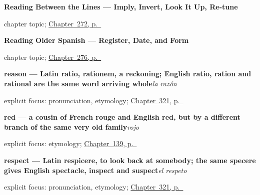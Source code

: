 \noindent\begin{minipage}[t]{\linewidth}
\raggedright
\textbf{Reading Between the Lines --- Imply, Invert, Look It Up, Re-tune}\par
\footnotesize chapter topic; \hyperref[ch:entrelineas]{Chapter~272, p.~\pageref*{ch:entrelineas}}
\end{minipage}\par\smallskip

\noindent\begin{minipage}[t]{\linewidth}
\raggedright
\textbf{Reading Older Spanish --- Register, Date, and Form}\par
\footnotesize chapter topic; \hyperref[ch:literario]{Chapter~276, p.~\pageref*{ch:literario}}
\end{minipage}\par\smallskip

\noindent\begin{minipage}[t]{\linewidth}
\raggedright
\textbf{reason — Latin ratio, rationem, a reckoning; English ratio, ration and rational are the same word arriving whole}\enspace\emph{la razón}\par
\footnotesize explicit focus: pronunciation, etymology; \hyperref[ch:placer-y-consejo]{Chapter~321, p.~\pageref*{ch:placer-y-consejo}}
\end{minipage}\par\smallskip

\noindent\begin{minipage}[t]{\linewidth}
\raggedright
\textbf{red — a cousin of French rouge and English red, but by a different branch of the same very old family}\enspace\emph{rojo}\par
\footnotesize explicit focus: etymology; \hyperref[ch:spanish-black-white-red-blue]{Chapter~139, p.~\pageref*{ch:spanish-black-white-red-blue}}
\end{minipage}\par\smallskip

\noindent\begin{minipage}[t]{\linewidth}
\raggedright
\textbf{respect — Latin respicere, to look back at somebody; the same specere gives English spectacle, inspect and suspect}\enspace\emph{el respeto}\par
\footnotesize explicit focus: pronunciation, etymology; \hyperref[ch:placer-y-consejo]{Chapter~321, p.~\pageref*{ch:placer-y-consejo}}
\end{minipage}\par\smallskip

